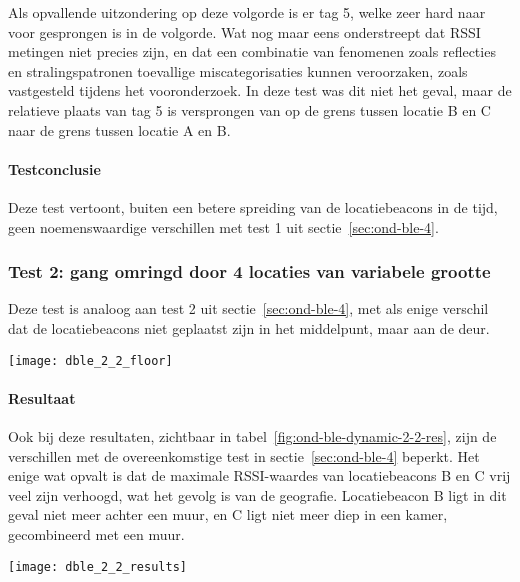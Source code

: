 Als opvallende uitzondering op deze volgorde is er tag 5, welke zeer hard naar voor gesprongen is in de volgorde. Wat nog maar eens onderstreept dat RSSI metingen niet precies zijn, en dat een combinatie van fenomenen zoals reflecties en stralingspatronen toevallige miscategorisaties kunnen veroorzaken, zoals vastgesteld tijdens het vooronderzoek. In deze test was dit niet het geval, maar de relatieve plaats van tag 5 is versprongen van op de grens tussen locatie B en C naar de grens tussen locatie A en B.

\paragraph{Testconclusie}
Deze test vertoont, buiten een betere spreiding van de locatiebeacons in de tijd, geen noemenswaardige verschillen met test 1 uit sectie~\ref{sec:ond-ble-4}.

\subsubsection{Test 2: gang omringd door 4 locaties van variabele grootte}
\label{sec:ond-ble-5-2}
\begin{minipage}{0.55\textwidth}
Deze test is analoog aan test 2 uit sectie~\ref{sec:ond-ble-4}, met als enige verschil dat de locatiebeacons niet geplaatst zijn in het middelpunt, maar aan de deur.
\end{minipage}
\hfill
\begin{minipage}{0.42\textwidth}
	\texttt{[image: dble\_2\_2\_floor]}
	\label{fig:ond-ble-dynamic-2-2-ops}
\end{minipage}

\paragraph{Resultaat}
\begin{minipage}{0.42\textwidth}
Ook bij deze resultaten, zichtbaar in tabel~\ref{fig:ond-ble-dynamic-2-2-res}, zijn de verschillen met de overeenkomstige test in sectie~\ref{sec:ond-ble-4} beperkt. Het enige wat opvalt is dat de maximale RSSI-waardes van locatiebeacons B en C vrij veel zijn verhoogd, wat het gevolg is van de geografie. Locatiebeacon B ligt in dit geval niet meer achter een muur, en C ligt niet meer diep in een kamer, gecombineerd met een muur. 
\end{minipage}
\hfill
\begin{minipage}{0.55\textwidth}
	\texttt{[image: dble\_2\_2\_results]}
	\label{fig:ond-ble-dynamic-2-2-res}
\end{minipage}

